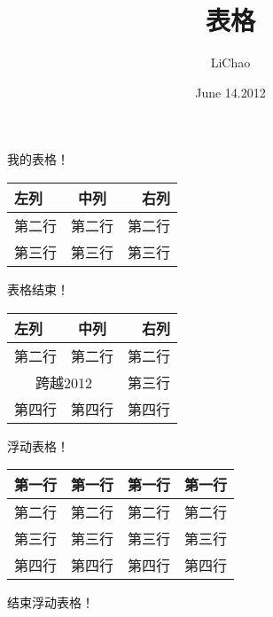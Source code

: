 \documentclass[UTF8]{ctexart}
\title{表格}
\author{LiChao}
\date{June 14.2012}
\begin{document}
\maketitle

我的表格！

\begin{tabular}{|l|c|r|} %
\hline                   %
左列 & 中列 & 右列 \\     %
\hline
第二行 & 第二行 & 第二行 \\
\hline
第三行 & 第三行 & 第三行 \\
\hline

\end{tabular}

表格结束！

\begin{tabular}{|l|c|r|}
\hline
左列& 中列& 右列\\
\hline
第二行& 第二行& 第二行\\
\hline
\multicolumn{2}{|c|}{跨越2012} & 第三行\\  %
\hline
第四行& 第四行& 第四行\\
\hline
\end{tabular}


浮动表格！
\begin{table}[htbp!] %
\centering
\begin{tabular}{|l|c|c|r|}
\hline
第一行& 第一行& 第一行& 第一行\\
\hline
第二行& 第二行& 第二行& 第二行\\
\hline
第三行& 第三行& 第三行& 第三行\\
\hline
第四行& 第四行& 第四行& 第四行\\
\hline
\end{tabular}
\end{table}

结束浮动表格！
\end{document}
